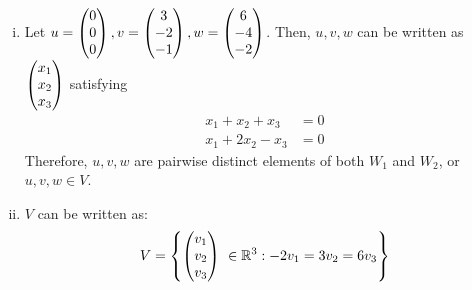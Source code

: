 \begin{sol}
\begin{enumerate}[(i)]
\begin{proof}
\begin{enumerate}[(1)]
\[\begin{aligned}
                    \end{aligned}  
                \]
                Since $p_1+2p_2-p_3=q_1+2q_2-q_3=0$, $(p_1+q_1)+2(p_2+q_2)-(p_3+q_3)=0$, it follows that $ a+b\in\ W_2 $. Therefore, vector addition is closed under $ W_2 $.
                \item Scalar multiplication is closed under $W_1$ and $W_2$: Let $u\in W_1, v\in W_2, \lam\in\R$. Then, $u,v$ can be written as $u=\colvecthree{x_1}{x_2}{x_3} $, $v=\colvecthree{y_1}{y_2}{y_3}$ such that $x_1,x_2,x_3,y_1,y_2,y_3\in\R$ and $x_1+x_2+x_3=y_1+2y_2-y_3=0$. We have:
                \[
                    \begin{aligned}
                        \lam u = \colvecthree{\lam x_1}{\lam x_2}{\lam x_3},
                        \lam v = \colvecthree{\lam y_1}{\lam y_2}{\lam y_3}
                    \end{aligned}
                \]
                Since $x_1+x_2+x_3=y_1+2y_2-y_3=0$, $\lam x_1+\lam x_2+\lam x_3=\lam y_1+2\lam y_2-\lam y_3=0$. Thus, $\lam u\in W_1$ and $\lam v\in W_2$, or scalar multiplication is closed under both $W_1$ and $W_2$.
            \end{enumerate}
            Therefore, $W_1$ and $W_2$ are both subspaces of $\R^{3}.$
        \end{proof}
        \item Let $u=\begin{pmatrix} 0\\ 0\\ 0\end{pmatrix}, v=\begin{pmatrix} 3\\ -2\\ -1\end{pmatrix}, w=\begin{pmatrix} 6\\ -4\\ -2\end{pmatrix}$. Then, $u,v,w$ can be written as $\begin{pmatrix} x_1\\ x_2\\ x_3\end{pmatrix}$ satisfying 
        \[
            \begin{aligned}
                x_1+x_2+x_3 &= 0\\
                x_1+2x_2-x_3&= 0
            \end{aligned}
        \]
        Therefore, $u,v,w$ are pairwise distinct elements of both $W_1$ and $W_2$, or $u,v,w\in V$.
        \item $V$ can be written as:
        \[
            \begin{aligned}
                V=\left\{ \begin{pmatrix} v_1\\ v_2\\ v_3\end{pmatrix}\ \in\mathbb R^{3} : -2v_1=3v_2=6v_3 \right\}
            \end{aligned}
        \]
        
    \end{enumerate}
\end{sol}